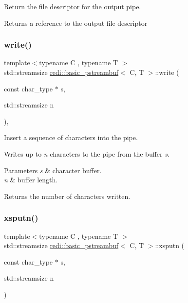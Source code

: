 Return the file descriptor for the output pipe. 

\begin{DoxyReturn}{Returns}
a reference to the output file descriptor 
\end{DoxyReturn}
\mbox{\label{classredi_1_1basic__pstreambuf_a48f8ea6b033a4623ce854363a64b908a}} 
\subsubsection{\texorpdfstring{write()}{write()}}
{\footnotesize\ttfamily template$<$typename C , typename T $>$ \\
std\+::streamsize \mbox{\hyperlink{classredi_1_1basic__pstreambuf}{redi\+::basic\+\_\+pstreambuf}}$<$ C, T $>$\+::write (\begin{DoxyParamCaption}\item[{const char\+\_\+type $\ast$}]{s,  }\item[{std\+::streamsize}]{n }\end{DoxyParamCaption})\hspace{0.3cm}{\ttfamily [inline]}, {\ttfamily [protected]}}



Insert a sequence of characters into the pipe. 

Writes up to {\itshape n} characters to the pipe from the buffer {\itshape s}.


\begin{DoxyParams}{Parameters}
{\em s} & character buffer. \\
\hline
{\em n} & buffer length. \\
\hline
\end{DoxyParams}
\begin{DoxyReturn}{Returns}
the number of characters written. 
\end{DoxyReturn}
\mbox{\label{classredi_1_1basic__pstreambuf_a329b61903a31fa3113b583f0be9fbf8d}} 
\subsubsection{\texorpdfstring{xsputn()}{xsputn()}}
{\footnotesize\ttfamily template$<$typename C , typename T $>$ \\
std\+::streamsize \mbox{\hyperlink{classredi_1_1basic__pstreambuf}{redi\+::basic\+\_\+pstreambuf}}$<$ C, T $>$\+::xsputn (\begin{DoxyParamCaption}\item[{const char\+\_\+type $\ast$}]{s,  }\item[{std\+::streamsize}]{n }\end{DoxyParamCaption})\hspace{0.3cm}{\ttfamily [protected]}}



